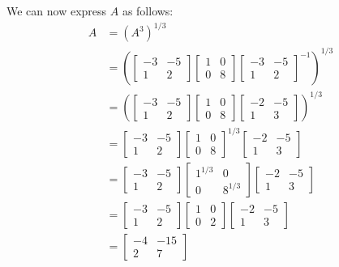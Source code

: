 \documentclass{article}
\begin{document}
We can now express $A$ as follows:
\begin{align*}
  A&=(A^3)^{1/3}\\
  &=\left(\begin{bmatrix}
    -3&-5\\1&2
  \end{bmatrix}\begin{bmatrix}
    1&0\\0&8
  \end{bmatrix}\begin{bmatrix}
    -3&-5\\1&2
  \end{bmatrix}^{-1}\right)^{1/3}\tag{eigendecomposition}\\
  &=\left(\begin{bmatrix}
    -3&-5\\1&2
  \end{bmatrix}\begin{bmatrix}
    1&0\\0&8
  \end{bmatrix}\begin{bmatrix}
    -2&-5\\1&3
  \end{bmatrix}\right)^{1/3}\tag{inverse of a $2\times2$ matrix}\\
  &=\begin{bmatrix}
    -3&-5\\1&2
  \end{bmatrix}\begin{bmatrix}
    1&0\\0&8
  \end{bmatrix}^{1/3}\begin{bmatrix}
    -2&-5\\1&3
  \end{bmatrix}\tag{$n$th power of an eigendecomposition}\\
  &=\begin{bmatrix}
    -3&-5\\1&2
  \end{bmatrix}\begin{bmatrix}
    1^{1/3}&0\\0&8^{1/3}
  \end{bmatrix}\begin{bmatrix}
    -2&-5\\1&3
  \end{bmatrix}\tag{$n$th power of a diagonal matrix}\\
  &=\begin{bmatrix}
    -3&-5\\1&2
  \end{bmatrix}\begin{bmatrix}
    1&0\\0&2
  \end{bmatrix}\begin{bmatrix}
    -2&-5\\1&3
  \end{bmatrix}\\
  &=\begin{bmatrix}
    -4&-15\\2&7
  \end{bmatrix}
\end{align*}
\end{document}
